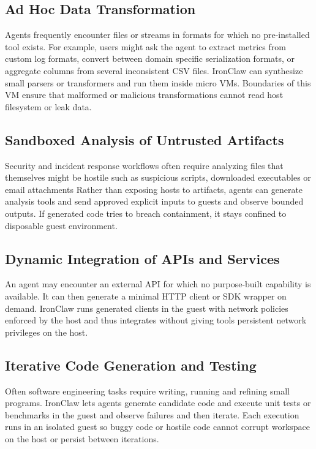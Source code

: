 \subsection{Ad Hoc Data Transformation}
Agents frequently encounter files or streams in formats for which no
pre-installed tool exists. For example, users might ask the agent to extract
metrics from custom log formats, convert between domain specific serialization
formats, or aggregate columns from several inconsistent CSV files. IronClaw can
synthesize small parsers or transformers and run them inside micro VMs.
Boundaries of this VM ensure that malformed or malicious transformations cannot
read host filesystem or leak data.

\subsection{Sandboxed Analysis of Untrusted Artifacts}
Security and incident response workflows often require analyzing files that
themselves might be hostile such as suspicious scripts, downloaded executables
or email attachments Rather than exposing hosts to artifacts, agents can
generate analysis tools and send approved explicit inputs to guests and observe
bounded outputs. If generated code tries to breach containment, it stays
confined to disposable guest environment.

\subsection{Dynamic Integration of APIs and Services}
An agent may encounter an external API for which no purpose-built capability is
available. It can then generate a minimal HTTP client or SDK wrapper on demand.
IronClaw runs generated clients in the guest with network policies enforced by
the host and thus integrates without giving tools persistent network privileges
on the host.

\subsection{Iterative Code Generation and Testing}
Often software engineering tasks require writing, running and refining small
programs. IronClaw lets agents generate candidate code and execute unit tests or
benchmarks in the guest and observe failures and then iterate. Each execution
runs in an isolated guest so buggy code or hostile code cannot corrupt workspace
on the host or persist between iterations.

